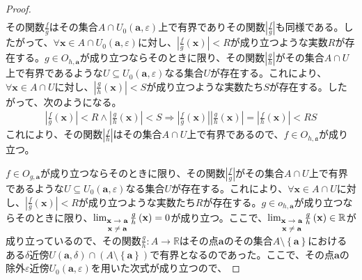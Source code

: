 \documentclass[dvipdfmx]{jsarticle}
\begin{document}
\begin{proof}
\begin{align*}
\end{align*}
その関数$\frac{f}{g}$はその集合$A \cap U_{0}\left( \mathbf{a},\varepsilon \right)$上で有界でありその関数$\left| \frac{f}{g} \right|$も同様である。したがって、$\forall\mathbf{x} \in A \cap U_{0}\left( \mathbf{a},\varepsilon \right)$に対し、$\left| \frac{f}{g}\left( \mathbf{x} \right) \right| < R$が成り立つような実数$R$が存在する。$g \in O_{h,\mathbf{a}}$が成り立つならそのときに限り、その関数$\left| \frac{g}{h} \right|$がその集合$A \cap U$上で有界であるような$U \subseteq U_{0}\left( \mathbf{a},\varepsilon \right)$なる集合$U$が存在する。これにより、$\forall\mathbf{x} \in A \cap U$に対し、$\left| \frac{g}{h}\left( \mathbf{x} \right) \right| < S$が成り立つような実数たち$S$が存在する。したがって、次のようになる。
\begin{align*}
\left| \frac{f}{g}\left( \mathbf{x} \right) \right| < R \land \left| \frac{g}{h}\left( \mathbf{x} \right) \right| < S \Rightarrow \left| \frac{f}{g}\left( \mathbf{x} \right) \right|\left| \frac{g}{h}\left( \mathbf{x} \right) \right| = \left| \frac{f}{h}\left( \mathbf{x} \right) \right| < RS
\end{align*}
これにより、その関数$\left| \frac{f}{h} \right|$はその集合$A \cap U$上で有界であるので、$f \in O_{h,\mathfrak{a}}$が成り立つ。\par
$f \in O_{g,\mathbf{a}}$が成り立つならそのときに限り、その関数$\left| \frac{f}{g} \right|$がその集合$A \cap U$上で有界であるような$U \subseteq U_{0}\left( \mathbf{a},\varepsilon \right)$なる集合$U$が存在する。これにより、$\forall\mathbf{x} \in A \cap U$に対し、$\left| \frac{f}{g}\left( \mathbf{x} \right) \right| < R$が成り立つような実数たち$R$が存在する。$g \in o_{h,\mathbf{a}}$が成り立つならそのときに限り、$\lim_{\scriptsize \begin{matrix}
\mathbf{x} \rightarrow \mathbf{a} \\
\mathbf{x} \neq \mathbf{a} \\
\end{matrix}}{\frac{g}{h}\left( \mathbf{x} \right)} = 0$が成り立つ。ここで、$\lim_{\scriptsize \begin{matrix}
\mathbf{x} \rightarrow \mathbf{a} \\
\mathbf{x} \neq \mathbf{a} \\
\end{matrix}}{\frac{g}{h}\left( \mathbf{x} \right)} \in \mathbb{R}$が成り立っているので、その関数$\frac{g}{h}:A \rightarrow \mathbb{R}$はその点$\mathbf{a}$のその集合$A \setminus \left\{ \mathbf{a} \right\}$におけるある$\delta$近傍$U\left( \mathbf{a},\delta \right) \cap \left( A \setminus \left\{ \mathbf{a} \right\} \right)$で有界となるのであった。ここで、その点$\mathbf{a}$の除外$\varepsilon$近傍$U_{0}\left( \mathbf{a},\varepsilon \right)$を用いた次式が成り立つので、

\end{proof}
\end{document}
